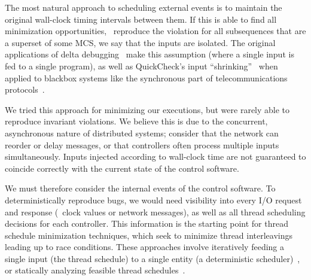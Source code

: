  The most natural approach to scheduling
external events is to maintain the original wall-clock timing intervals
between them.
If this is able to find all minimization opportunities,
\ie~reproduce the violation for all
subsequences that are a superset of some MCS, we say that the inputs are
isolated. The original applications of delta
debugging~\cite{Zeller:1999:YMP:318773.318946} make this assumption (where a
single input is fed to a single program), as well as QuickCheck's input ``shrinking''~\cite{claessen2000quickcheck}
when applied to blackbox systems like the synchronous part of
telecommunications protocols~\cite{arts2006testing}.

We tried this approach for minimizing our executions, but were rarely
able to reproduce invariant violations. We believe this is due
to the concurrent, asynchronous nature of distributed systems; consider that the network
can reorder or delay messages, or that controllers often
process multiple inputs simultaneously.
Inputs injected according to wall-clock time are not guaranteed to
coincide correctly with the current state of the control software.

We must therefore consider the internal events of the control software. To deterministically
reproduce bugs, we would need visibility into every I/O request and response (\eg~clock
values or network messages), as well as all thread scheduling
decisions for each controller. This information is the starting point for thread schedule
minimization
techniques, which seek to minimize thread interleavings leading up to race conditions.
These approaches involve iteratively feeding a single input (the thread
schedule) to a single entity (a deterministic scheduler)~\cite{choi2002isolating,claessen2009finding,jalbert2010trace}, or
statically analyzing feasible thread schedules~\cite{huang2011efficient}.

